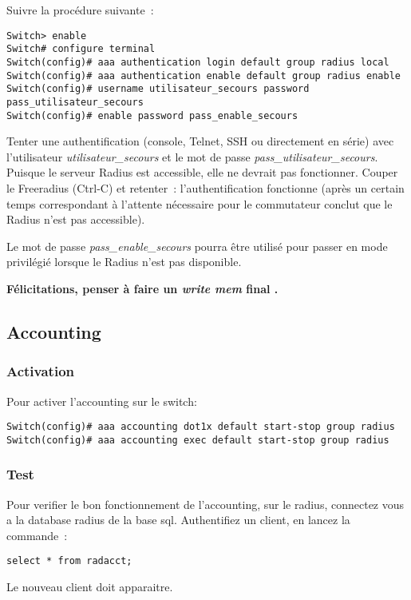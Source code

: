 Suivre la procédure suivante~:

\begin{lstlisting}
Switch> enable
Switch# configure terminal
Switch(config)# aaa authentication login default group radius local
Switch(config)# aaa authentication enable default group radius enable
Switch(config)# username utilisateur_secours password pass_utilisateur_secours
Switch(config)# enable password pass_enable_secours
\end{lstlisting}

Tenter une authentification (console, Telnet, SSH ou directement en série) avec l'utilisateur \emph{utilisateur\_secours} et le mot de passe \emph{pass\_utilisateur\_secours}. Puisque le serveur Radius est accessible, elle ne devrait pas fonctionner. Couper le Freeradius (Ctrl-C) et retenter~: l'authentification fonctionne (après un certain temps correspondant à l'attente nécessaire pour le commutateur conclut que le Radius n'est pas accessible).

Le mot de passe \emph{pass\_enable\_secours} pourra être utilisé pour passer en mode privilégié lorsque le Radius n'est pas disponible.

\textbf{Félicitations, penser à faire un \emph{write mem} final \Coffeecup.}


\subsection{Accounting}
\subsubsection{Activation}
Pour activer l'accounting sur le switch: 
\begin{lstlisting}
Switch(config)# aaa accounting dot1x default start-stop group radius
Switch(config)# aaa accounting exec default start-stop group radius
\end{lstlisting}

\subsubsection{Test}
Pour verifier le bon fonctionnement de l'accounting, sur le radius, connectez vous a la database radius de la base sql.
Authentifiez un client, en lancez la commande~: 
\begin{lstlisting}
select * from radacct;
\end{lstlisting}
Le nouveau client doit apparaitre.
